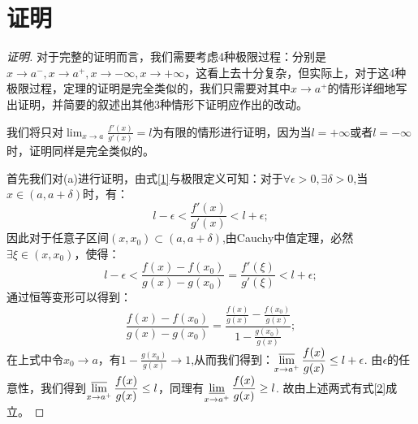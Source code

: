 \documentclass{ctexart}
\begin{document}
\section{证明}
\begin{proof}[证明]
对于完整的证明而言，我们需要考虑4种极限过程：分别是$x \rightarrow a^-,x \rightarrow a^+,x \rightarrow -\infty,x \rightarrow +\infty$，这看上去十分复杂，但实际上，对于这4种极限过程，定理的证明是完全类似的，我们只需要对其中$x \rightarrow a^+$的情形详细地写出证明，并简要的叙述出其他3种情形下证明应作出的改动。

我们将只对$\displaystyle \lim_{x \rightarrow a}\frac{f'(x)}{g'(x)}=l$为有限的情形进行证明，因为当$l=+\infty$或者$l=-\infty$时，证明同样是完全类似的。

首先我们对(a)进行证明，由式\ref{1}与极限定义可知：对于$\forall\epsilon>0,\exists\delta>0$,当$x\in(a,a+\delta)$时，有：
$$
	l-\epsilon<\frac{f'(x)}{g'(x)}<l+\epsilon;
$$
因此对于任意子区间$(x,x_0)\subset(a,a+\delta)$,由Cauchy中值定理，必然$\exists\xi\in(x,x_0)$，使得：
\begin{equation}
	l-\epsilon<\frac{f(x)-f(x_0)}{g(x)-g(x_0)}=\frac{f'(\xi)}{g'(\xi)}<l+\epsilon;\label{5}
\end{equation}
通过恒等变形可以得到：
$$
\frac{f(x)-f(x_0)}{g(x)-g(x_0)}=\frac{\frac{f(x)}{g(x)}-\frac{f(x_0)}{g(x)}}{1-\frac{g(x_0)}{g(x)}};
$$
在上式中令$x_0\rightarrow a$，有$1-\displaystyle\frac{g(x_0)}{g(x)}\rightarrow 1$,从而我们得到：$\displaystyle\varlimsup_{x \rightarrow a^+}\frac{f(x)}{g(x)}\le l+\epsilon$.
由$\epsilon$的任意性，我们得到$\displaystyle\varlimsup_{x \rightarrow a^+}\frac{f(x)}{g(x)}\le l$，同理有$\displaystyle\varliminf_{x \rightarrow a^+}\frac{f(x)}{g(x)}\ge l$.
故由上述两式有式\ref{2}成立。


\end{proof}
\end{document}
